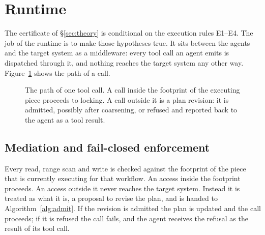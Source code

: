 \section{Runtime}
\label{sec:runtime}

The certificate of \S\ref{sec:theory} is conditional on the execution rules
E1--E4. The job of the runtime is to make those hypotheses true. It sits
between the agents and the target system as a middleware: every tool call an
agent emits is dispatched through it, and nothing reaches the target system
any other way. Figure~\ref{fig:arch} shows the path of a call.

\begin{figure}[t]
\centering
{}
\caption{The path of one tool call. A call inside the footprint of the
executing piece proceeds to locking. A call outside it is a plan revision: it
is admitted, possibly after coarsening, or refused and reported back to the
agent as a tool result.}
\label{fig:arch}
\end{figure}

\subsection{Mediation and fail-closed enforcement}

Every read, range scan and write is checked against the footprint of the
piece that is currently executing for that workflow. An access inside the
footprint proceeds. An access outside it never reaches the target system.
Instead it is treated as what it is, a proposal to revise the plan, and is
handed to Algorithm~\ref{alg:admit}. If the revision is admitted the plan is
updated and the call proceeds; if it is refused the call fails, and the agent
receives the refusal as the result of its tool call.

